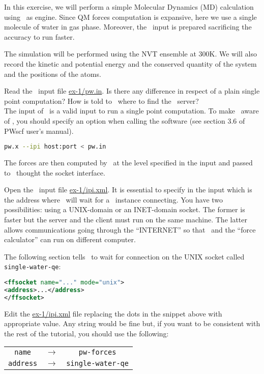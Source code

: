 \documentclass{article}
\begin{document}
\begin{Exercise}[label={i-pi},title={Molecular Dynamics: a client/server approach}]

In this exercise, we will perform a simple Molecular Dynamics (MD)
calculation using \PWscf\ as engine. Since QM forces computation is
expansive, here we use a single molecule of water in gas phase. Moreover, the
\PWscf\ input is prepared sacrificing the accuracy to run faster.

The simulation will be performed using the NVT ensemble at 300K.  We
will also record the kinetic and potential energy and the conserved
quantity of the system and the positions of the atoms.

\Question
Read the \PWscf\ input file \url{ex-1/pw.in}.
Is there any difference in respect of a plain single point computation?
How is told to \pwx\ where to find the \ipi\ server?\\

The input of \pwx\ is a valid input to run a single point
computation. To make \pwx\ aware of \ipi, you should specify an option
when calling the software (see section 3.6 of PWscf user's manual).
\begin{lstlisting}[language=bash]
pw.x --ipi host:port < pw.in
\end{lstlisting}
The forces are then computed by \pwx\ at the level specified in the
input and passed to \ipi\ thought the socket interface.

\Question
Open the \ipi\ input file \url{ex-1/ipi.xml}. It is essential to
specify in the input which is the address where \ipi\ will wait for a
\pwx\ instance connecting. You have two possibilities: using a UNIX-domain
or an INET-domain socket. The former is faster but the server and the
client must run on the same machine. The latter allows communications
going through the ``INTERNET'' so that \ipi\ and the ``force
calculator'' can run on different computer. 

The following section tells \ipi\ to wait for connection on the UNIX
socket called \texttt{single-water-qe}:
\begin{lstlisting}[language=xml]
<ffsocket name="..." mode="unix">
<address>...</address>
</ffsocket>
\end{lstlisting}
Edit the \url{ex-1/ipi.xml} file replacing the dots in the snippet
above with appropriate value. Any string would be fine but, if you
want to be consistent with the rest of the tutorial, you should use
the following:
\begin{table}[h!]
  \centering
  \begin{tabular}{ccc}
    \texttt{name} & $\longrightarrow$ & \texttt{pw-forces}\\
    \texttt{address} & $\longrightarrow$ & \texttt{single-water-qe}
  \end{tabular}
\end{table}



\end{Exercise}
\end{document}
